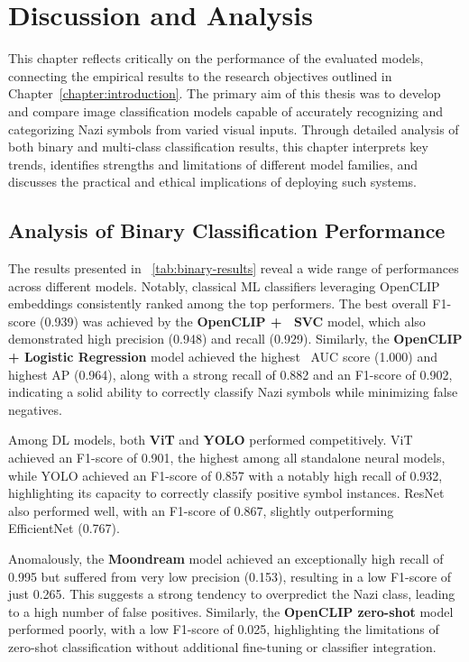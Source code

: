 
\chapter{Discussion and Analysis}\label{chapter:discussion-and-analysis}

This chapter reflects critically on the performance of the evaluated models, connecting the empirical results to the
research objectives outlined in Chapter~\ref{chapter:introduction}. The primary aim of this thesis was to develop
and compare image classification models capable of accurately recognizing and categorizing Nazi symbols from varied
visual inputs. Through detailed analysis of both binary and multi-class classification results, this chapter
interprets key trends, identifies strengths and limitations of different model families, and discusses the practical
and ethical implications of deploying such systems.

\section{Analysis of Binary Classification Performance}

The results presented in ~\autoref{tab:binary-results} reveal a wide range of performances across different models.
Notably, classical \ac{ML} classifiers leveraging OpenCLIP embeddings consistently ranked among the top
performers. The best overall F1-score (0.939) was achieved by the \textbf{OpenCLIP + ~\ac{SVC}} model, which also
demonstrated high precision (0.948) and recall (0.929). Similarly, the \textbf{OpenCLIP + Logistic Regression}
model achieved the highest ~\ac{AUC} score (1.000) and highest \ac{AP} (0.964), along with a strong recall of 0.882
and an F1-score of 0.902, indicating a solid ability to correctly classify Nazi symbols while minimizing false
negatives.

Among \ac{DL} models, both \textbf{\ac{ViT}} and \textbf{\ac{YOLO}} performed competitively. \ac{ViT} achieved an
F1-score of 0.901, the highest among all standalone neural models, while \ac{YOLO} achieved an F1-score of 0.857 with
a notably high recall of 0.932, highlighting its capacity to correctly classify positive symbol instances.
\ac{ResNet} also performed well, with an F1-score of 0.867, slightly outperforming EfficientNet (0.767).

Anomalously, the \textbf{Moondream} model achieved an exceptionally high recall of 0.995 but suffered from very low
precision (0.153), resulting in a low F1-score of just 0.265. This suggests a strong tendency to overpredict the
Nazi class, leading to a high number of false positives. Similarly, the \textbf{OpenCLIP zero-shot} model performed
poorly, with a low F1-score of 0.025, highlighting the limitations of zero-shot classification without additional
fine-tuning or classifier integration.

